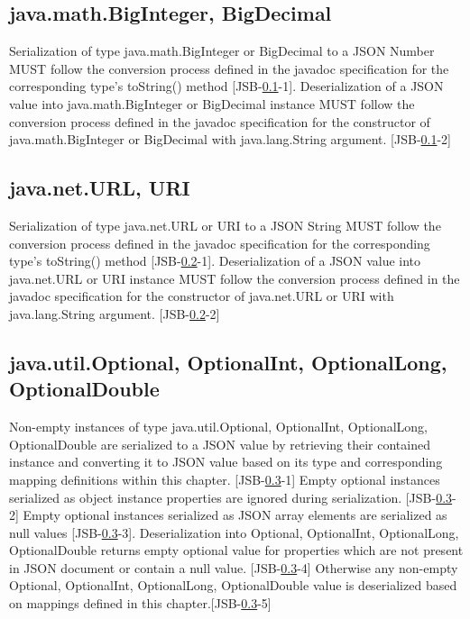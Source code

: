 \subsection{java.math.BigInteger, BigDecimal}
\label{subsec:bignumber}
Serialization of type java.math.BigInteger or BigDecimal to a JSON Number 
MUST follow the conversion process defined in the javadoc specification for the corresponding type's toString() method [JSB-\ref{subsec:bignumber}-1]. 
Deserialization of a JSON value into java.math.BigInteger or BigDecimal instance 
MUST follow the conversion process defined in the javadoc specification for the constructor of java.math.BigInteger or BigDecimal with java.lang.String argument. [JSB-\ref{subsec:bignumber}-2]

\subsection{java.net.URL, URI}
\label{subsec:url}
Serialization of type java.net.URL or URI to a JSON String 
MUST follow the conversion process defined in the javadoc specification for the corresponding type's toString() method [JSB-\ref{subsec:url}-1]. 
Deserialization of a JSON value into java.net.URL or URI instance 
MUST follow the conversion process defined in the javadoc specification for the constructor of java.net.URL or URI with java.lang.String argument. [JSB-\ref{subsec:url}-2]

\subsection{java.util.Optional, OptionalInt, OptionalLong, OptionalDouble}
\label{subsec:optional}
Non-empty instances of type java.util.Optional, OptionalInt, OptionalLong, OptionalDouble are serialized to a JSON value by retrieving their contained instance and 
converting it to JSON value based on its type and corresponding mapping definitions within this chapter. [JSB-\ref{subsec:optional}-1] 
Empty optional instances serialized as object instance properties are ignored during serialization. [JSB-\ref{subsec:optional}-2] 
Empty optional instances serialized as JSON array elements are serialized as null values [JSB-\ref{subsec:optional}-3]. 
Deserialization into Optional, OptionalInt, OptionalLong, OptionalDouble returns empty optional value for properties which are not present in JSON document or contain a null value. [JSB-\ref{subsec:optional}-4] 
Otherwise any non-empty Optional, OptionalInt, OptionalLong, OptionalDouble value is deserialized based on mappings defined in this chapter.[JSB-\ref{subsec:optional}-5]

